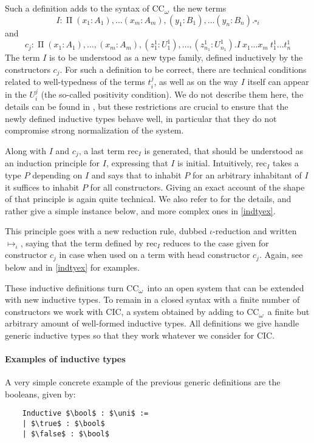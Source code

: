 \documentclass[en]{myarticle}
\renewcommand{\mathtt}{\mathrm}
\newcommand{\uni}[1][]{\square_{#1}}
\newcommand{\red}{\mapsto}
\newcommand{\ired}{\red_\iota}
\renewcommand{\P}{\operatorname{\Pi}}
\DeclareMathOperator{\?}{?}
\newcommand{\rec}{\mathtt{rec}}
\newcommand{\bool}{\mathbf{B}}
\newcommand{\true}{\mathtt{true}}
\newcommand{\false}{\mathtt{false}}
\newcommand{\coc}{CC\textsubscript{$\omega$}}
\begin{document}
{Such a definition adds to the syntax of \coc\ the new terms
\[I :  \P (x_1 : A_1),\dots (x_m : A_m),(y_1 : B_1),\dots (y_n : B_n) . \uni[i]\]
and
\[c_j :  \P (x_1 : A_1), \dots, (x_m : A_m), (z_1^1 : U_1^1), \dots, (z_{n_1}^1 : U_{n_1}^1) . I~x_1\dots x_m~t_1^1\dots t_n^1\]
The term $I$ is to be understood as a new type family, defined inductively by the constructors $c_j$. For such a definition to be correct, there are technical conditions related to well-typedness of the terms $t_i^j$, as well as on the way $I$ itself can appear in the $U_i^j$ (the so-called positivity condition). We do not describe them here, the details can be found in \cite{Paulin-Mohring1993}, but these restrictions are crucial to ensure that the newly defined inductive types behave well, in particular that they do not compromise strong normalization of the system.

Along with $I$ and $c_j$, a last term $\rec_I$ is generated, that should be understood as an induction principle for $I$, expressing that $I$ is initial. Intuitively, $\rec_I$ takes a type $P$ depending on $I$ and says that to inhabit $P$ for an arbitrary inhabitant of $I$ it suffices to inhabit $P$ for all constructors.  Giving an exact account of the shape of that principle is again quite technical. We also refer to \cite{Paulin-Mohring1993} for the details, and rather give a simple instance below, and more complex ones in \autoref{indtyex}.

This principle goes with a new reduction rule, dubbed $\iota$-reduction and written $\ired$, saying that the term defined by $\rec_I$ reduces to the case given for constructor $c_j$ in case when used on a term with head constructor $c_j$. Again, see below and in \autoref{indtyex} for examples.

These inductive definitions turn \coc\ into an open system that can be extended with new inductive types. To remain in a closed syntax with a finite number of constructors we work with CIC, a system obtained by adding to \coc\ a finite but arbitrary amount of well-formed inductive types. All definitions we give handle generic inductive types so that they work whatever we consider for CIC.

\paragraph{Examples of inductive types}

A very simple concrete example of the previous generic definitions are the booleans, given by:
	\begin{lstlisting}
	Inductive $\bool$ : $\uni$ :=
	| $\true$ : $\bool$
	| $\false$ : $\bool$
	\end{lstlisting}

}
\end{document}

